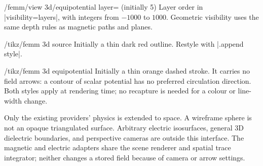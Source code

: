 \begin{key}{/femm/view 3d/equipotential layer= (initially 5)}
Layer order in |visibility=layers|, with integers from $-1000$ to $1000$.
Geometric visibility uses the same depth rules as magnetic paths and planes.
\end{key}
\begin{key}{/tikz/femm 3d source}
Initially a thin dark red outline. Restyle with |.append style|.
\end{key}
\begin{key}{/tikz/femm 3d equipotential}
Initially a thin orange dashed stroke. It carries no field arrows: a contour
of scalar potential has no preferred circulation direction. Both styles apply
at rendering time; no recapture is needed for a colour or line-width change.
\end{key}

Only the existing providers' physics is extended to space. A wireframe sphere
is not an opaque triangulated surface. Arbitrary electric isosurfaces, general
3D dielectric boundaries, and perspective cameras are outside this interface.
The magnetic and electric adapters share the scene renderer and spatial trace
integrator; neither changes a stored field because of camera or arrow settings.
